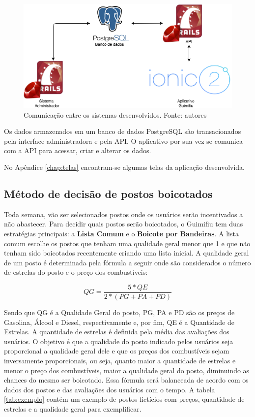 \begin{figure}[H]
    \centering
    \includegraphics[scale=0.5]{figuras/comunicacao_sistemas.png}
    \caption[Comunicação entre os sistemas desenvolvidos.]{Comunicação entre os sistemas desenvolvidos. Fonte: autores}
    \label{img:comunicacaosistemas}
\end{figure}

Os dados armazenados em um banco de dados PostgreSQL são transacionados pela interface administradora e pela API. O aplicativo por sua vez se comunica com a API para acessar, criar e alterar os dados.

No Apêndice \ref{chap:telas} encontram-se algumas telas da aplicação desenvolvida.

\subsection{Método de decisão de postos boicotados}
Toda semana, vão ser selecionados postos onde os usuários serão incentivados a não abastecer. Para decidir quais postos serão boicotados, o Guimifiu tem duas estratégias principais: a \textbf{Lista Comum} e o \textbf{Boicote por Bandeiras}. A lista comum escolhe os postos que tenham uma qualidade geral menor que 1 e que não tenham sido boicotados recentemente criando uma lista inicial. A qualidade geral de um posto é determinada pela fórmula a seguir onde são considerados o número de estrelas do posto e o preço dos combustíveis:

\begin{equation}
\label{Equação para cálculo de qualidade geral do Combustível}
	QG = \frac{5*QE}{2*(PG + PA + PD)}
\end{equation}

Sendo que QG é a Qualidade Geral do posto, PG, PA e PD são os preços de Gasolina, Álcool e Diesel, respectivamente e, por fim, QE é a Quantidade de Estrelas. A quantidade de estrelas é definida pela média das avaliações dos usuários. O objetivo é que a qualidade do posto indicado pelos usuários seja proporcional a qualidade geral dele e que os preços dos combustíveis sejam inversamente proporcionais, ou seja, quanto maior a quantidade de estrelas e menor o preço dos combustíveis, maior a qualidade geral do posto, diminuindo as chances do mesmo ser boicotado. Essa fórmula será balanceada de acordo com os dados dos postos e das avaliações dos usuários com o tempo. A tabela \ref{tab:exemplo} contém um exemplo de postos fictícios com preços, quantidade de estrelas e a qualidade geral para exemplificar.

